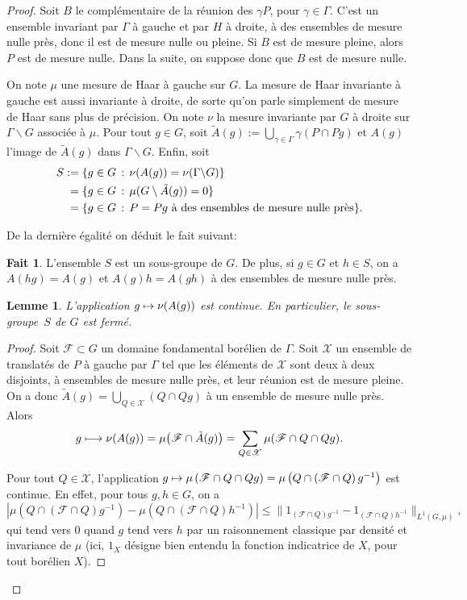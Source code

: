\documentclass[JEP,XML,SOM,Unicode,francais,published]{cedram}
\newcommand\mto{\mathchoice{\longmapsto}{\mapsto}{\mapsto}{\mapsto}}
\newcommand{\bnorm}[1]{\bigl\lVert#1\bigr\rVert}
\newtheorem{lem}[thm]{Lemme}
\theoremstyle{definition}
\newtheorem{fait}[thm]{Fait}
\begin{document}
\begin{proof}
Soit $B$ le complémentaire de la réunion des $\gamma P$, pour $\gamma \in\Gamma$. C'est un ensemble invariant par $\Gamma$ à gauche et par $H$ à droite, à des ensembles de mesure nulle près, donc il est de mesure nulle ou pleine. Si $B$ est de mesure pleine, alors $P$ est de mesure nulle. Dans la suite, on suppose donc que $B$ est de mesure nulle.

On note $\mu$ une mesure de Haar à gauche sur $G$. La mesure de Haar invariante à gauche est aussi invariante à droite, de sorte qu'on parle simplement de mesure de Haar sans plus de précision. On note $\nu$ la mesure invariante par $G$ à droite sur $\Gamma\backslash G$ associée à $\mu$.
Pour tout $g \in G$, soit $\tilde{A}(g):= \bigcup_{\gamma \in \Gamma} \gamma(P\cap Pg)$ et $A(g)$ l'image de $\tilde{A}(g)$ dans $\Gamma\backslash G$. Enfin, soit
\begin{align*}S &:= \{g \in G\,:\,\nu(A(g))= \nu(\Gamma\backslash G)\}\\
&\hphantom{:}= \{g \in G\,:\,\mu(G\setminus\tilde{A}(g)) = 0\}\\
&\hphantom{:}= \{g\in G\,:\,P = Pg \text{ à des ensembles de mesure nulle près}\}.\end{align*}

De la dernière égalité on déduit le fait suivant:

\begin{fait}
\label{fait-inv}
L'ensemble $S$ est un sous-groupe de $G$. De plus, si $g \in G$ et $h \in S$, on a $A(hg) = A(g)$ et $A(g)h = A(gh)$ à des ensembles de mesure nulle près.
\end{fait}

\begin{lem}
L'application $g \mto \nu(A(g))$ est continue. En particulier, le sous-groupe~$S$ de $G$ est fermé.
\end{lem}
\begin{proof}
Soit $\mathscr{F} \subset G$ un domaine fondamental borélien de $\Gamma$. Soit $\mathscr{X}$ un ensemble de translatés de $P$ à gauche par $\Gamma$ tel que les éléments de $\mathscr{X}$ sont deux à deux disjoints, à ensembles de mesure nulle près, et leur réunion est de mesure pleine. On a donc $\tilde{A}(g) = \bigcup_{Q \in \mathscr{X}} (Q \cap Qg)$ à un ensemble de mesure nulle près.
Alors \[g \mto \nu(A(g)) = \mu\bigl(\mathscr{F} \cap \tilde{A}(g)\bigr) = \sum_{Q \in \mathscr{X}}\mu(\mathscr{F} \cap Q \cap Qg).\]

Pour tout $Q \in \mathscr{X}$, l'application $g \mto \mu\left(\mathscr{F} \cap Q \cap Qg\right) = \mu\left(Q \cap \left(\mathscr{F} \cap Q\right)g^{-1}\right)$ est continue. En effet, pour tous $g, h \in G$, on a
\[\left|\mu\left(Q \cap \left(\mathscr{F} \cap Q\right)g^{-1}\right) - \mu\left(Q \cap \left(\mathscr{F} \cap Q\right)h^{-1}\right)\right| \leq \bnorm{1_{(\mathscr{F} \cap Q)g^{-1}} - 1_{(\mathscr{F} \cap Q)h^{-1}}}_{L^1(G, \mu)},\]qui tend vers $0$ quand $g$ tend vers $h$ par un raisonnement classique par densité et invariance de $\mu$ (ici, $1_X$ désigne bien entendu la fonction indicatrice de $X$, pour tout borélien $X$).


\end{proof}
\end{proof}
\end{document}
